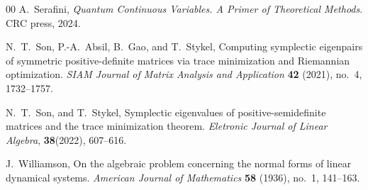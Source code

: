 \documentclass[preprint,12pt]{elsarticle}
\begin{document}
\begin{thebibliography}{00}
A.~Serafini, \emph{Quantum Continuous Variables. A Primer of Theoretical Methods}.
CRC press, 2024.

{N.~T.~Son, P.-A.~Absil, B.~Gao, and T.~Stykel}, {Computing symplectic
  eigenpairs of symmetric positive-definite matrices via trace minimization and Riemannian optimization}. \emph{SIAM Journal of Matrix Analysis and Application}
  \textbf{42} (2021), no.~4, 1732--1757.

N.~T.~Son, and T.~Stykel, Symplectic eigenvalues of positive-semidefinite matrices
and the trace minimization theorem. \emph{Eletronic Journal of Linear Algebra}, \textbf{38}(2022), 607–616.


J.~Williamson, On the algebraic problem concerning the normal forms of linear dynamical systems.
\emph{American Journal of Mathematics} \textbf{58} (1936), no.~1, 141--163.

\end{thebibliography}
\end{document}
